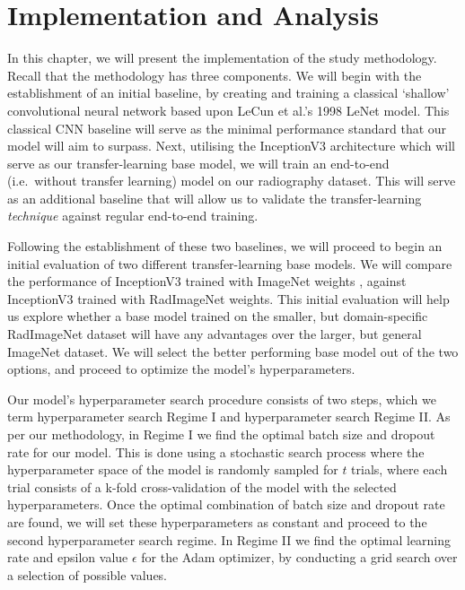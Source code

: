 \chapter{Implementation and Analysis}\label{implementation}

In this chapter, we will present the implementation of the study methodology. Recall that the methodology has three components. We will begin with the establishment of an initial baseline, by creating and training a classical \enquote*{shallow} convolutional neural network based upon LeCun et al.'s 1998 LeNet model. \autocite{lenet1998} This classical CNN baseline will serve as the minimal performance standard that our model will aim to surpass. Next, utilising the InceptionV3 architecture which will serve as our transfer-learning base model, we will train an end-to-end (i.e.\ without transfer learning) model on our radiography dataset. This will serve as an additional baseline that will allow us to validate the transfer-learning \emph{technique} against regular end-to-end training.

Following the establishment of these two baselines, we will proceed to begin an initial evaluation of two different transfer-learning base models. We will compare the performance of InceptionV3 trained with ImageNet weights \autocite{imagenet}, against InceptionV3 trained with RadImageNet \autocite{radimagenet} weights. This initial evaluation will help us explore whether a base model trained on the smaller, but domain-specific RadImageNet dataset will have any advantages over the larger, but general ImageNet dataset. We will select the better performing base model out of the two options, and proceed to optimize the model's hyperparameters.

Our model's hyperparameter search procedure consists of two steps, which we term hyperparameter search Regime I and hyperparameter search Regime II. As per our methodology, in Regime I we find the optimal batch size and dropout rate for our model. This is done using a stochastic search process where the hyperparameter space of the model is randomly sampled for \(t\) trials, where each trial consists of a k-fold cross-validation of the model with the selected hyperparameters. Once the optimal combination of batch size and dropout rate are found, we will set these hyperparameters as constant and proceed to the second hyperparameter search regime. In Regime II we find the optimal learning rate and epsilon value \(\epsilon\) for the Adam optimizer, by conducting a grid search over a selection of possible values.

